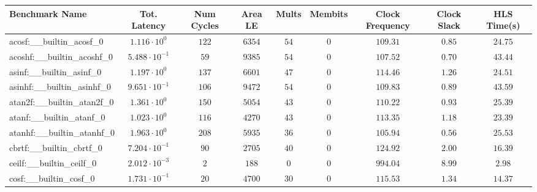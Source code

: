 \begin{tabular}{|l|c|c|c|c|c|c|c|c|}
\hline
Benchmark Name                            & Tot. Latency            & Num Cycles & Area LE    & Mults    & Membits & Clock Frequency & Clock Slack & HLS Time(s) \\
\hline
acosf:\_\_builtin\_acosf\_0               & $ 1.116 \cdot 10^{0}  $ & $ 122    $ & $ 6354   $ & $ 54   $ & $ 0   $ & $ 109.31      $ & $ 0.85    $ & $ 24.75   $ \\
acoshf:\_\_builtin\_acoshf\_0             & $ 5.488 \cdot 10^{-1} $ & $ 59     $ & $ 9385   $ & $ 54   $ & $ 0   $ & $ 107.52      $ & $ 0.70    $ & $ 43.44   $ \\
asinf:\_\_builtin\_asinf\_0               & $ 1.197 \cdot 10^{0}  $ & $ 137    $ & $ 6601   $ & $ 47   $ & $ 0   $ & $ 114.46      $ & $ 1.26    $ & $ 24.51   $ \\
asinhf:\_\_builtin\_asinhf\_0             & $ 9.651 \cdot 10^{-1} $ & $ 106    $ & $ 9472   $ & $ 54   $ & $ 0   $ & $ 109.83      $ & $ 0.89    $ & $ 43.59   $ \\
atan2f:\_\_builtin\_atan2f\_0             & $ 1.361 \cdot 10^{0}  $ & $ 150    $ & $ 5054   $ & $ 43   $ & $ 0   $ & $ 110.22      $ & $ 0.93    $ & $ 25.39   $ \\
atanf:\_\_builtin\_atanf\_0               & $ 1.023 \cdot 10^{0}  $ & $ 116    $ & $ 4270   $ & $ 43   $ & $ 0   $ & $ 113.35      $ & $ 1.18    $ & $ 23.39   $ \\
atanhf:\_\_builtin\_atanhf\_0             & $ 1.963 \cdot 10^{0}  $ & $ 208    $ & $ 5935   $ & $ 36   $ & $ 0   $ & $ 105.94      $ & $ 0.56    $ & $ 25.53   $ \\
cbrtf:\_\_builtin\_cbrtf\_0               & $ 7.204 \cdot 10^{-1} $ & $ 90     $ & $ 2705   $ & $ 40   $ & $ 0   $ & $ 124.92      $ & $ 2.00    $ & $ 16.39   $ \\
ceilf:\_\_builtin\_ceilf\_0               & $ 2.012 \cdot 10^{-3} $ & $ 2      $ & $ 188    $ & $ 0    $ & $ 0   $ & $ 994.04      $ & $ 8.99    $ & $ 2.98    $ \\
cosf:\_\_builtin\_cosf\_0                 & $ 1.731 \cdot 10^{-1} $ & $ 20     $ & $ 4700   $ & $ 30   $ & $ 0   $ & $ 115.53      $ & $ 1.34    $ & $ 14.37   $ \\

\end{tabular}
